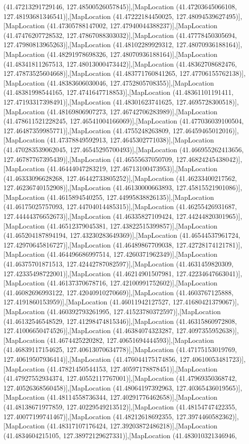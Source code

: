 (41.47213291729146, 127.48500526057845)],[MapLocation (41.47203645066108, 127.48193681346541)],[MapLocation (41.47222184450025, 127.48094539627495)],[MapLocation (41.47305788147002, 127.47940044388237)],[MapLocation (41.47476207728532, 127.47867088303032)],[MapLocation (41.47778450305694, 127.47980813965263)],[MapLocation (41.48102289929312, 127.48070936188164)],[MapLocation (41.48291978698326, 127.48070936188164)],[MapLocation (41.48341811267513, 127.48013000473442)],[MapLocation (41.48362708682476, 127.47873525604668)],[MapLocation (41.483771760841265, 127.47706155762138)],[MapLocation (41.48383606030046, 127.4752805708355)],[MapLocation (41.48381998544165, 127.4741647718853)],[MapLocation (41.48361101191411, 127.47193317398491)],[MapLocation (41.48301623741625, 127.4695728300518)],[MapLocation (41.48169806907273, 127.46742706283989)],[MapLocation (41.478611521228245, 127.46541004166069)],[MapLocation (41.477036039100504, 127.46487359985771)],[MapLocation (41.4755248263809, 127.46459465012016)],[MapLocation (41.47378849592913, 127.4645302771038)],[MapLocation (41.470283539062045, 127.46545295700493)],[MapLocation (41.466955262413656, 127.46787767395439)],[MapLocation (41.46555637050709, 127.46824245438042)],[MapLocation (41.46444047283219, 127.46713100473953)],[MapLocation (41.46333096628268, 127.46442733805252)],[MapLocation (41.46233400217562, 127.46236740152908)],[MapLocation (41.46130000663893, 127.45815521901086)],[MapLocation (41.4615894540255, 127.44995838826135)],[MapLocation (41.46175025757093, 127.44704014485315)],[MapLocation (41.46255426931687, 127.44444376652673)],[MapLocation (41.46335827109424, 127.44244820301965)],[MapLocation (41.46512379045381, 127.43822515399857)],[MapLocation (41.465204187894194, 127.43230283649369)],[MapLocation (41.46544537961724, 127.42970645816727)],[MapLocation (41.46489867709038, 127.42728174121781)],[MapLocation (41.464496686997514, 127.4260371962349)],[MapLocation (41.46375701871513, 127.42442787082597)],[MapLocation (41.4631459820309, 127.42335498722001)],[MapLocation (41.46214901507981, 127.42234647663041)],[MapLocation (41.46137370678716, 127.42100991752602)],[MapLocation (41.46082696993122, 127.42040910270669)],[MapLocation (41.4603767125888, 127.4191860153959)],[MapLocation (41.46011942127527, 127.41680421379067)],[MapLocation (41.460392793261995, 127.41523780372597)],[MapLocation (41.46132546548529, 127.41298474815346)],[MapLocation (41.46315860972808, 127.41006650474526)],[MapLocation (41.46384074323287, 127.4097355952638)],[MapLocation (41.4674425220282, 127.40651694444593)],[MapLocation (41.46839117154625, 127.40613070634778)],[MapLocation (41.47175153019769, 127.40619507936414)],[MapLocation (41.476044175174856, 127.40610053481723)],[MapLocation (41.47821450544153, 127.40597178878451)],[MapLocation (41.47927552934374, 127.40552117767001)],[MapLocation (41.47969350368742, 127.40526368560458)],[MapLocation (41.48064197392963, 127.40365436019565)],[MapLocation (41.48114558736344, 127.40291776462658)],[MapLocation (41.48138671977859, 127.40229549213512)],[MapLocation (41.48154747422355, 127.40077199741467)],[MapLocation (41.48212618692355, 127.3974460582362)],[MapLocation (41.48317107176424, 127.39203872486218)],[MapLocation (41.4834604215105, 127.38972129627331)],[MapLocation (41.483010321346946, 